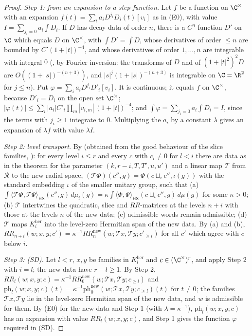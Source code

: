 \begin{proof}
\emph{Step 1: from an expansion to a step function.} Let $f$ be a function on $\C^\times$ with an expansion
$f(t)=\sum_ia_iD^{j_i}D_i(t)[v_i]$ as in (E0), with value $I=\sum_{j_i=0}a_i\int D_i$. If $D$ has decay data of order $n$, there
is a $C^n$ function $D'$ on $\C$ which equals $D$ on $\C^\times$, with $\int D'=\int D$, whose derivatives of order $\le n$ are
bounded by $C'(1+|t|)^{-4}$, and whose derivatives of order $1,\dots,n$ are integrable with integral $0$
(, by Fourier inversion: the transforms of
$D$ and of $(1+|t|^2)^2D$ are $O((1+|s|)^{-(n+3)})$, and $|s|^j(1+|s|)^{-(n+3)}$ is integrable on $\C=\R^2$ for $j\le n$).
Put $\varphi=\sum_ia_iD^{j_i}D'_i[v_i]$. It is continuous; it equals $f$ on $\C^\times$, because $D'_i=D_i$ on the open set
$\C^\times$; $|\varphi(t)|\le\sum_i|a_i|C'_i\prod_m|v_{i,m}|\,(1+|t|)^{-4}$; and $\int\varphi=\sum_{j_i=0}a_i\int D_i=I$, since
the terms with $j_i\ge1$ integrate to $0$. Multiplying the $a_i$ by a constant $\lambda$ gives an expansion of $\lambda f$ with
value $\lambda I$.

\emph{Step 2: level transport.} By  (obtained from the good
behaviour of the slice families, ): for every level $i\le r$ and every
$c$ with $c_l\ne0$ for $l<i$ there are data as in the theorem for the parameter $(k,r-i,T,T',u,u')$ and a linear map
$\mathcal T$ from $\mathcal R$ to the new radial space, $(\mathcal T\Phi)(c'',g)=\Phi(c\sqcup_ic'',\iota(g))$ with the standard
embedding $\iota$ of the smaller unitary group, such that
(a) $\int\langle\mathcal T\Phi,\mathcal T\Psi\rangle_{\mathrm{HS}}(c'',g)\,d\mu_i(g)=\kappa\int\langle\Phi,\Psi\rangle_{\mathrm{HS}}
(c\sqcup_ic'',g)\,d\mu(g)$ for some $\kappa>0$;
(b) $\mathcal T$ intertwines the quadratic, slice and $RR$-matrices at the levels $n+i$ with those at the levels $n$ of the new
data;
(c) admissible words remain admissible;
(d) $\mathcal T$ maps $K^{\mathrm{her}}_i$ into the level-zero Hermitian span of the new data.
By (a) and (b), $RR_{n+i}(w;x,y;c')=\kappa^{-1}RR^{\mathrm{new}}_n(w;\mathcal Tx,\mathcal Ty;c'_{\ge i})$ for all $c'$ which agree
with $c$ below $i$.

\emph{Step 3: (SD).} Let $l<r$, $x,y$ be families in $K^{\mathrm{her}}_l$ and $c\in(\C^\times)^r$, and apply Step 2 with
$i=l$; the new data have $r-l\ge1$. By Step 2, $RR_l(w;x,y;c)=\kappa^{-1}RR^{\mathrm{new}}_0(w;\mathcal Tx,\mathcal Ty;c_{\ge l})$
and $\mathrm{ph}_l(w;x,y;c)(t)=\kappa^{-1}\mathrm{ph}^{\mathrm{new}}_0(w;\mathcal Tx,\mathcal Ty;c_{\ge l})(t)$ for $t\ne0$; the
families $\mathcal Tx,\mathcal Ty$ lie in the level-zero Hermitian span of the new data, and $w$ is admissible for them. By (E0)
for the new data and Step 1 (with $\lambda=\kappa^{-1}$), $\mathrm{ph}_l(w;x,y;c)$ has an expansion with value
$RR_l(w;x,y;c)$, and Step 1 gives the function $\varphi$ required in (SD).


\end{proof}
